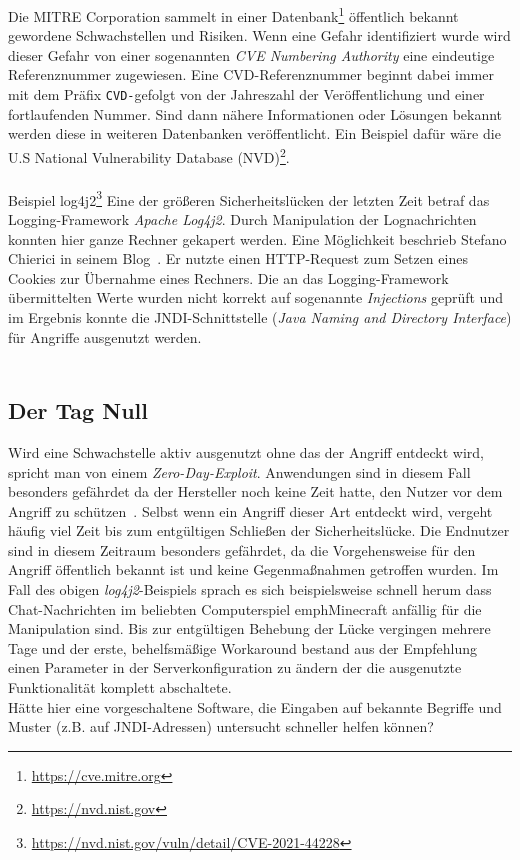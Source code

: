 Die MITRE Corporation sammelt in einer Datenbank\footnote{\url{https://cve.mitre.org}} öffentlich bekannt gewordene Schwachstellen und Risiken. Wenn eine Gefahr identifiziert wurde wird dieser Gefahr von einer sogenannten \emph{CVE Numbering Authority} eine eindeutige Referenznummer zugewiesen. Eine CVD-Referenznummer beginnt dabei immer mit dem Präfix \glqq\verb=CVD-=\grqq gefolgt von der Jahreszahl der Veröffentlichung und einer fortlaufenden Nummer. Sind dann nähere Informationen oder Lösungen bekannt werden diese in weiteren Datenbanken veröffentlicht. Ein Beispiel dafür wäre die U.S National Vulnerability Database (NVD)\footnote{\url{https://nvd.nist.gov}}.\\\\

\textcolor{bhtGray}{ Beispiel log4j2\footnote{\url{https://nvd.nist.gov/vuln/detail/CVE-2021-44228}}} Eine der größeren Sicherheitslücken der letzten Zeit betraf das Logging-Framework \emph{Apache Log4j2}. Durch Manipulation der Lognachrichten konnten hier ganze Rechner gekapert werden. Eine Möglichkeit beschrieb Stefano Chierici in seinem Blog~\cite{chierici2021}. Er nutzte einen HTTP-Request zum Setzen eines Cookies zur Übernahme eines Rechners. Die an das Logging-Framework übermittelten Werte wurden nicht korrekt auf sogenannte \emph{Injections} geprüft und im Ergebnis konnte die JNDI-Schnittstelle (\emph{Java Naming and Directory Interface}) für Angriffe ausgenutzt werden. \\\\

\subsection{Der Tag Null}

Wird eine Schwachstelle aktiv ausgenutzt ohne das der Angriff entdeckt wird, spricht man von einem \glqq\emph{Zero-Day-Exploit}\grqq. Anwendungen sind in diesem Fall besonders gefährdet da der Hersteller noch keine Zeit hatte, den Nutzer vor dem Angriff zu schützen~\cite{bsi0day}. Selbst wenn ein Angriff dieser Art entdeckt wird, vergeht häufig viel Zeit bis zum entgültigen Schließen der Sicherheitslücke. Die Endnutzer sind in diesem Zeitraum besonders gefährdet, da die Vorgehensweise für den Angriff öffentlich bekannt ist und keine Gegenmaßnahmen getroffen wurden. Im Fall des obigen \emph{log4j2}-Beispiels sprach es sich beispielsweise schnell herum dass Chat-Nachrichten im beliebten Computerspiel emph{Minecraft} anfällig für die Manipulation sind. Bis zur entgültigen Behebung der Lücke vergingen mehrere Tage und der erste, behelfsmäßige Workaround bestand aus der Empfehlung einen Parameter in der Serverkonfiguration zu ändern der die ausgenutzte Funktionalität komplett abschaltete.\\ Hätte hier eine vorgeschaltene Software, die Eingaben auf bekannte Begriffe und Muster (z.B. auf JNDI-Adressen) untersucht schneller helfen können?

